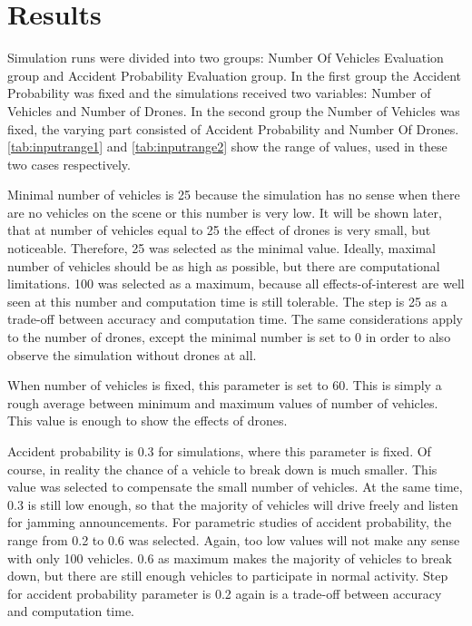 \documentclass[]{nsm-thesis}
\begin{document}
\section{Results}

Simulation runs were divided into two groups: Number Of Vehicles Evaluation group and Accident Probability Evaluation group. In the first group the Accident Probability was fixed and the simulations received two variables: Number of Vehicles and Number of Drones. In the second group the Number of Vehicles was fixed, the varying part consisted of Accident Probability and Number Of Drones. \cref{tab:inputrange1} and \cref{tab:inputrange2} show the range of values, used in these two cases respectively.

Minimal number of vehicles is 25 because the simulation has no sense when there are no vehicles on the scene or this number is very low. It will be shown later, that at number of vehicles equal to 25 the effect of drones is very small, but noticeable. Therefore, 25 was selected as the minimal value. Ideally, maximal number of vehicles should be as high as possible, but there are computational limitations. 100 was selected as a maximum, because all effects-of-interest are well seen at this number and computation time is still tolerable. The step is 25 as a trade-off between accuracy and computation time. The same considerations apply to the number of drones, except the minimal number is set to 0 in order to also observe the simulation without drones at all.

When number of vehicles is fixed, this parameter is set to 60. This is simply a rough average between minimum and maximum values of number of vehicles. This value is enough to show the effects of drones.

Accident probability is 0.3 for simulations, where this parameter is fixed. Of course, in reality the chance of a vehicle to break down is much smaller. This value was selected to compensate the small number of vehicles. At the same time, 0.3 is still low enough, so that the majority of vehicles will drive freely and listen for jamming announcements. For parametric studies of accident probability, the range from 0.2 to 0.6 was selected. Again, too low values will not make any sense with only 100 vehicles. 0.6 as maximum makes the majority of vehicles to break down, but there are still enough vehicles to participate in normal activity. Step for accident probability parameter is 0.2 again is a trade-off between accuracy and computation time.
\end{document}
